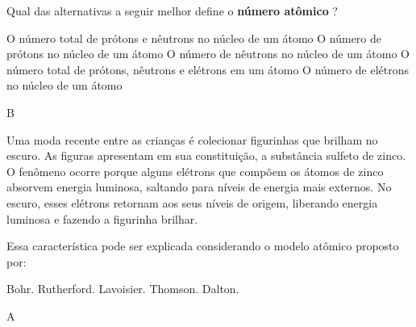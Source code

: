 \documentclass[9qpt]{scrartcl}
\begin{document}
\begin{exercise}[points=1.0]
Qual das alternativas a seguir melhor define o \textbf{número atômico} ?

\begin{choice}
\choice O número total de prótons e nêutrons no núcleo de um átomo
\choice O número de prótons no núcleo de um átomo
\choice O número de nêutrons no núcleo de um átomo
\choice O número total de prótons, nêutrons e elétrons em um átomo
\choice O número de elétrons no núcleo de um átomo
\end{choice}
\end{exercise}
\begin{solution}
B
\end{solution}





\begin{exercise}[points=1.0]
Uma moda recente entre as crianças é colecionar figurinhas que brilham no escuro. As figuras apresentam em sua constituição, a substância sulfeto de zinco. O fenômeno ocorre porque alguns elétrons que compõem os átomos de zinco absorvem energia luminosa, saltando para níveis de energia mais externos. No escuro, esses elétrons retornam aos seus níveis de origem, liberando energia luminosa e fazendo a figurinha brilhar.

Essa característica pode ser explicada considerando o modelo atômico proposto por:

\begin{choice}
\choice Bohr.
\choice Rutherford.
\choice Lavoisier.
\choice Thomson.
\choice Dalton.
\end{choice}
\end{exercise}
\begin{solution}
A
\end{solution}
\end{document}
